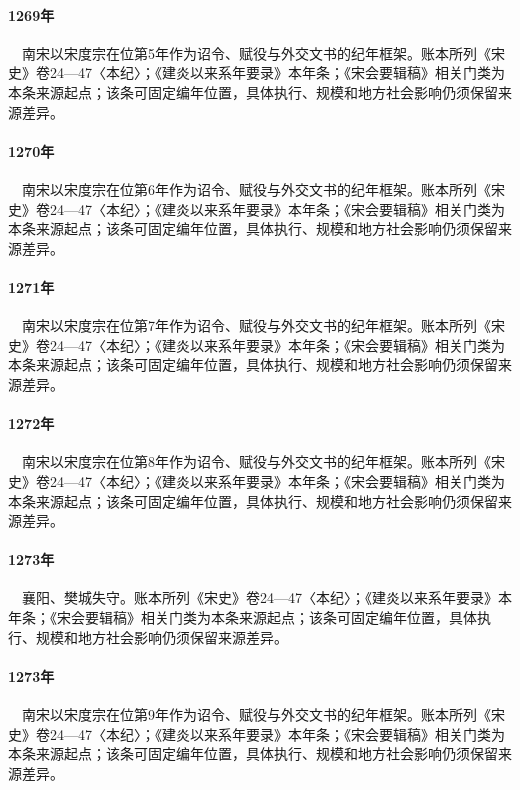 \paragraph{1269年}　南宋以宋度宗在位第5年作为诏令、赋役与外交文书的纪年框架。账本所列《宋史》卷24—47〈本纪〉；《建炎以来系年要录》本年条；《宋会要辑稿》相关门类为本条来源起点；该条可固定编年位置，具体执行、规模和地方社会影响仍须保留来源差异。

\paragraph{1270年}　南宋以宋度宗在位第6年作为诏令、赋役与外交文书的纪年框架。账本所列《宋史》卷24—47〈本纪〉；《建炎以来系年要录》本年条；《宋会要辑稿》相关门类为本条来源起点；该条可固定编年位置，具体执行、规模和地方社会影响仍须保留来源差异。

\paragraph{1271年}　南宋以宋度宗在位第7年作为诏令、赋役与外交文书的纪年框架。账本所列《宋史》卷24—47〈本纪〉；《建炎以来系年要录》本年条；《宋会要辑稿》相关门类为本条来源起点；该条可固定编年位置，具体执行、规模和地方社会影响仍须保留来源差异。

\paragraph{1272年}　南宋以宋度宗在位第8年作为诏令、赋役与外交文书的纪年框架。账本所列《宋史》卷24—47〈本纪〉；《建炎以来系年要录》本年条；《宋会要辑稿》相关门类为本条来源起点；该条可固定编年位置，具体执行、规模和地方社会影响仍须保留来源差异。

\paragraph{1273年}　襄阳、樊城失守。账本所列《宋史》卷24—47〈本纪〉；《建炎以来系年要录》本年条；《宋会要辑稿》相关门类为本条来源起点；该条可固定编年位置，具体执行、规模和地方社会影响仍须保留来源差异。

\paragraph{1273年}　南宋以宋度宗在位第9年作为诏令、赋役与外交文书的纪年框架。账本所列《宋史》卷24—47〈本纪〉；《建炎以来系年要录》本年条；《宋会要辑稿》相关门类为本条来源起点；该条可固定编年位置，具体执行、规模和地方社会影响仍须保留来源差异。

